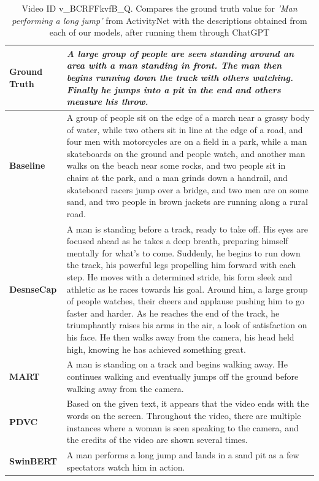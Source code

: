 \begin{table}[!htbp]
    \centering
    \renewcommand{\arraystretch}{1.4}
        \begin{tabular}{|p{2cm}p{14cm}|} 
             \hline
             \textbf{Ground Truth} & \textit{A large group of people are seen standing around an area with a man standing in front. The man then begins running down the track with others watching. Finally he jumps into a pit in the end and others measure his throw.}\\
             \hline
              \textbf{Baseline} & A group of people sit on the edge of a march near a grassy body of water, while two others sit in line at the edge of a road, and four men with motorcycles are on a field in a park, while a man skateboards on the ground and people watch, and another man walks on the beach near some rocks, and two people sit in chairs at the park, and a man grinds down a handrail, and skateboard racers jump over a bridge, and two men are on some sand, and two people in brown jackets are running along a rural road. \\
              \textbf{DesnseCap } & A man is standing before a track, ready to take off. His eyes are focused ahead as he takes a deep breath, preparing himself mentally for what's to come. Suddenly, he begins to run down the track, his powerful legs propelling him forward with each step. He moves with a determined stride, his form sleek and athletic as he races towards his goal. Around him, a large group of people watches, their cheers and applause pushing him to go faster and harder. As he reaches the end of the track, he triumphantly raises his arms in the air, a look of satisfaction on his face. He then walks away from the camera, his head held high, knowing he has achieved something great. \\
              \textbf{MART } &  A man is standing on a track and begins walking away. He continues walking and eventually jumps off the ground before walking away from the camera.\\
              \textbf{PDVC}  & Based on the given text, it appears that the video ends with the words on the screen. Throughout the video, there are multiple instances where a woman is seen speaking to the camera, and the credits of the video are shown several times.\\
              \textbf{SwinBERT}  & A man performs a long jump and lands in a sand pit as a few spectators watch him in action.\\ 
             \hline
        \end{tabular}
    \caption{Video ID \- v\_BCRFFkvfB\_Q. Compares the ground truth value for \textit{'Man performing a long jump'} from ActivityNet with the descriptions obtained from each of our models, after running them through ChatGPT}
    \label{tab:table2}
\end{table}
